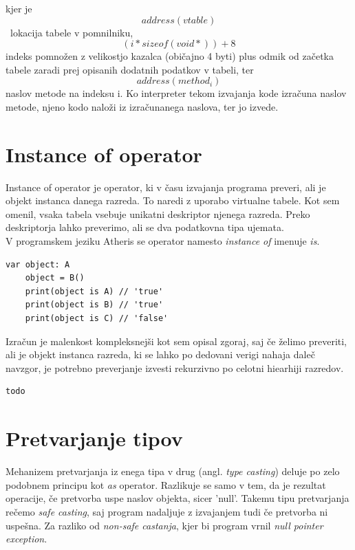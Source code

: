 \documentclass[a4paper, 12pt]{book}
\begin{document}
kjer je \[address(vtable)\]\ lokacija tabele v pomnilniku, \[(i * sizeof(void*)) + 8\] indeks pomnožen z velikostjo kazalca (običajno 4 byti) plus odmik od začetka tabele zaradi prej opisanih dodatnih podatkov v tabeli, ter \[ address(method_i)\] naslov metode na indeksu i. Ko interpreter tekom izvajanja kode izračuna naslov metode, njeno kodo naloži iz izračunanega naslova, ter jo izvede.

\section{Instance of operator}

Instance of operator je operator, ki v času izvajanja programa preveri, ali je objekt instanca danega razreda. To naredi z uporabo virtualne tabele. Kot sem omenil, vsaka tabela vsebuje unikatni deskriptor njenega razreda. Preko deskriptorja lahko preverimo, ali se dva podatkovna tipa ujemata. \\
\indent V programskem jeziku Atheris se operator namesto \textit{instance of} imenuje \textit{is}.

\begin{lstlisting}[caption={Uporaba operatorja \textit{is} za razrede iz sheme ~\ref{vtables}}, captionpos=b]
	var object: A
	object = B()
	print(object is A) // 'true'
	print(object is B) // 'true'
	print(object is C) // 'false'
\end{lstlisting}

Izračun je malenkost kompleksnejši kot sem opisal zgoraj, saj če želimo preveriti, ali je objekt instanca razreda, ki se lahko po dedovani verigi nahaja daleč navzgor, je potrebno preverjanje izvesti rekurzivno po celotni hiearhiji razredov. \\

\begin{lstlisting}[caption={Algoritem za izračun ali je objekt instanca danega razeda}, captionpos=b]
todo
\end{lstlisting}

\section{Pretvarjanje tipov}

Mehanizem pretvarjanja iz enega tipa v drug (angl. \textit{type casting}) deluje po zelo podobnem principu kot \textit{as} operator. Razlikuje se samo v tem, da je rezultat operacije, če pretvorba uspe naslov objekta, sicer 'null'. Takemu tipu pretvarjanja rečemo \textit{safe casting}, saj program nadaljuje z izvajanjem tudi če pretvorba ni uspešna. Za razliko od \textit{non-safe castanja}, kjer bi program vrnil \textit{null pointer exception}.
\end{document}
